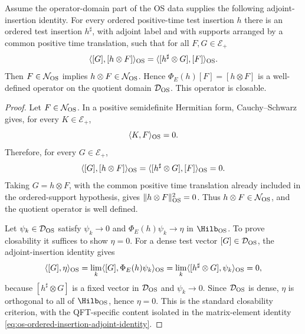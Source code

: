 \begin{proposition}
\label{prop:os-ordered-field-closability}
Assume the operator-domain part of the OS data supplies the following
adjoint-insertion identity.  For every ordered positive-time test insertion
\(h\) there is an ordered test insertion \(h^\sharp\), with adjoint label and
with supports arranged by a common positive time translation, such that for
all \(F,G\in\mathcal E_+\)
\begin{equation}
  \langle [G],[h\otimes F]\rangle_{\rm OS}
  =
  \langle [h^\sharp\otimes G],[F]\rangle_{\rm OS}.
  \label{eq:os-ordered-insertion-adjoint-identity}
\end{equation}
Then \(F\in\mathcal N_{\rm OS}\) implies
\(h\otimes F\in\mathcal N_{\rm OS}\).  Hence
\(\Phi_E(h)[F]=[h\otimes F]\) is a well-defined operator on the quotient
domain \(\mathcal D_{\rm OS}\).  This operator is closable.
\end{proposition}

\begin{proof}
Let \(F\in\mathcal N_{\rm OS}\).  In a positive semidefinite Hermitian form,
Cauchy--Schwarz gives, for every \(K\in\mathcal E_+\),
\[
  \langle K,F\rangle_{\rm OS}=0 .
\]
Therefore, for every \(G\in\mathcal E_+\),
\[
  \langle [G],[h\otimes F]\rangle_{\rm OS}
  =
  \langle [h^\sharp\otimes G],[F]\rangle_{\rm OS}
  =
  0 .
\]
Taking \(G=h\otimes F\), with the common positive time translation already
included in the ordered-support hypothesis, gives
\(\|h\otimes F\|_{\rm OS}^2=0\).  Thus \(h\otimes F\in\mathcal N_{\rm OS}\),
and the quotient operator is well defined.

Let \(\psi_k\in\mathcal D_{\rm OS}\) satisfy
\(\psi_k\to0\) and \(\Phi_E(h)\psi_k\to\eta\) in \(\Hilb_{\rm OS}\).  To
prove closability it suffices to show \(\eta=0\).  For a dense test vector
\([G]\in\mathcal D_{\rm OS}\), the adjoint-insertion identity gives
\[
  \langle [G],\eta\rangle_{\rm OS}
  =
  \lim_k\langle [G],\Phi_E(h)\psi_k\rangle_{\rm OS}
  =
  \lim_k\langle [h^\sharp\otimes G],\psi_k\rangle_{\rm OS}
  =
  0,
\]
because \([h^\sharp\otimes G]\) is a fixed vector in
\(\mathcal D_{\rm OS}\) and \(\psi_k\to0\).  Since \(\mathcal D_{\rm OS}\) is
dense, \(\eta\) is orthogonal to all of \(\Hilb_{\rm OS}\), hence
\(\eta=0\).  This is the standard closability criterion, with the
QFT-specific content isolated in the matrix-element identity
\eqref{eq:os-ordered-insertion-adjoint-identity}.
\end{proof}

